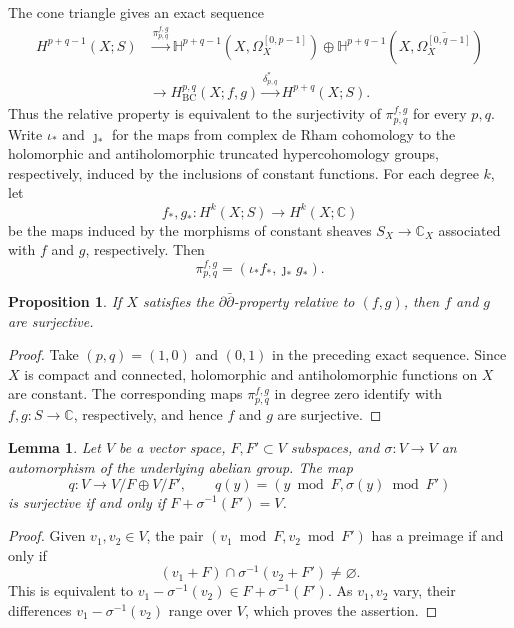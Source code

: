 \documentclass[11pt]{amsart}
\numberwithin{equation}{section}
\theoremstyle{plain}
\newtheorem{Le}[thm]{Lemma}
\newtheorem{Pro}[thm]{Proposition}
\theoremstyle{definition}
\begin{document}
The cone triangle gives an exact sequence
\[
\begin{aligned}
H^{p+q-1}(X;S)&\xrightarrow{\pi_{p,q}^{f,g}}
\mathbb H^{p+q-1}(X,\Omega_X^{[0,p-1]})
\oplus\mathbb H^{p+q-1}(X,\overline{\Omega_X^{[0,q-1]}})\\
&\longrightarrow H^{p,q}_{\mathrm{BC}}(X;f,g)
\xrightarrow{\delta_{p,q}^*}H^{p+q}(X;S).
\end{aligned}
\]
Thus the relative property is equivalent to the surjectivity of
$\pi_{p,q}^{f,g}$ for every $p,q$. Write $\iota_*$ and $\jmath_*$ for the maps
from complex de Rham cohomology to the holomorphic and antiholomorphic
truncated hypercohomology groups, respectively, induced by the inclusions
of constant functions.
For each degree $k$, let
\[
f_*,g_*:H^k(X;S)\longrightarrow H^k(X;\mathbb C)
\]
be the maps induced by the morphisms of constant
sheaves $S_X\to\mathbb C_X$ associated with $f$ and $g$, respectively.
Then
\[
\pi_{p,q}^{f,g}=(\iota_*f_*,\jmath_*g_*).
\]

\begin{Pro}\label{prop-relative-ddbar-coefficients}
If $X$ satisfies the $\partial\bar\partial$-property relative to $(f,g)$,
then $f$ and $g$ are surjective.
\end{Pro}
\begin{proof}
Take $(p,q)=(1,0)$ and $(0,1)$ in the preceding exact sequence.
Since $X$ is compact and connected, holomorphic and antiholomorphic
functions on $X$ are constant. The corresponding maps $\pi_{p,q}^{f,g}$ in
degree zero identify with $f,g:S\to\mathbb C$, respectively, and hence
$f$ and $g$ are surjective.
\end{proof}

\begin{Le}\label{lem-relative-quotient-surjectivity}
Let $V$ be a vector space, $F,F'\subset V$ subspaces, and
$\sigma:V\longrightarrow V$ an automorphism of the underlying
abelian group. The map
\[
q:V\longrightarrow V/F\oplus V/F',\qquad
q(y)=(y\bmod F,\sigma(y)\bmod F')
\]
is surjective if and only if $F+\sigma^{-1}(F')=V$.
\end{Le}
\begin{proof}
Given $v_1,v_2\in V$, the pair $(v_1\bmod F,v_2\bmod F')$ has a preimage if
and only if
\[
(v_1+F)\cap\sigma^{-1}(v_2+F')\ne\varnothing.
\]
This is equivalent to
$v_1-\sigma^{-1}(v_2)\in F+\sigma^{-1}(F')$.
As $v_1,v_2$ vary, their differences $v_1-\sigma^{-1}(v_2)$ range over $V$,
which proves the assertion.
\end{proof}
\end{document}
